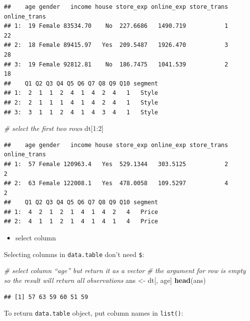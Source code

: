 \documentclass[]{book}
\newenvironment{Shaded}{\begin{snugshade}}{\end{snugshade}}
\newcommand{\KeywordTok}[1]{\textcolor[rgb]{0.13,0.29,0.53}{\textbf{{#1}}}}
\newcommand{\DecValTok}[1]{\textcolor[rgb]{0.00,0.00,0.81}{{#1}}}
\newcommand{\StringTok}[1]{\textcolor[rgb]{0.31,0.60,0.02}{{#1}}}
\newcommand{\CommentTok}[1]{\textcolor[rgb]{0.56,0.35,0.01}{\textit{{#1}}}}
\newcommand{\NormalTok}[1]{{#1}}
\providecommand{\tightlist}{%
  \setlength{\itemsep}{0pt}\setlength{\parskip}{0pt}}
\theoremstyle{definition}
\theoremstyle{definition}
\theoremstyle{remark}
\begin{document}
\begin{verbatim}
##    age gender   income house store_exp online_exp store_trans online_trans
## 1:  19 Female 83534.70    No  227.6686   1490.719           1           22
## 2:  18 Female 89415.97   Yes  209.5487   1926.470           3           28
## 3:  19 Female 92812.81    No  186.7475   1041.539           2           18
##    Q1 Q2 Q3 Q4 Q5 Q6 Q7 Q8 Q9 Q10 segment
## 1:  2  1  1  2  4  1  4  2  4   1   Style
## 2:  2  1  1  1  4  1  4  2  4   1   Style
## 3:  3  1  1  2  4  1  4  3  4   1   Style
\end{verbatim}

\begin{Shaded}
\begin{Highlighting}[]
\CommentTok{# select the first two rows}
\NormalTok{dt[}\DecValTok{1}\NormalTok{:}\DecValTok{2}\NormalTok{]}
\end{Highlighting}
\end{Shaded}

\begin{verbatim}
##    age gender   income house store_exp online_exp store_trans online_trans
## 1:  57 Female 120963.4   Yes  529.1344   303.5125           2            2
## 2:  63 Female 122008.1   Yes  478.0058   109.5297           4            2
##    Q1 Q2 Q3 Q4 Q5 Q6 Q7 Q8 Q9 Q10 segment
## 1:  4  2  1  2  1  4  1  4  2   4   Price
## 2:  4  1  1  2  1  4  1  4  1   4   Price
\end{verbatim}

\begin{itemize}
\tightlist
\item
  select column
\end{itemize}

Selecting columns in \texttt{data.table} don't need \texttt{\$}:

\begin{Shaded}
\begin{Highlighting}[]
\CommentTok{# select column “age” but return it as a vector}
\CommentTok{# the argument for row is empty so the result will return all observations}
\NormalTok{ans <-}\StringTok{ }\NormalTok{dt[, age]}
\KeywordTok{head}\NormalTok{(ans)}
\end{Highlighting}
\end{Shaded}

\begin{verbatim}
## [1] 57 63 59 60 51 59
\end{verbatim}

To return \texttt{data.table} object, put column names in
\texttt{list()}:
\end{document}
